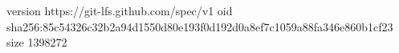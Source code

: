 version https://git-lfs.github.com/spec/v1
oid sha256:85c54326c32b2a94d1550d80e193f0d192d0a8ef7c1059a88fa346e860b1cf23
size 1398272
